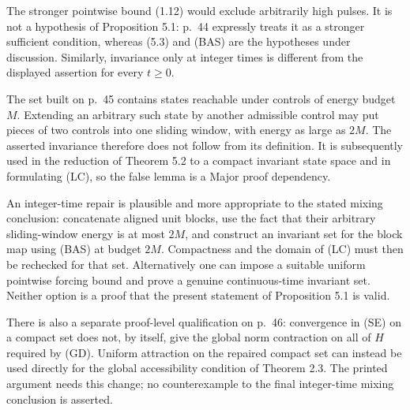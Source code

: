 \documentclass[10pt]{article}
\begin{document}
The stronger pointwise bound (1.12) would exclude arbitrarily high pulses. It is not a hypothesis of Proposition 5.1: p. 44 expressly treats it as a stronger sufficient condition, whereas (5.3) and (BAS) are the hypotheses under discussion. Similarly, invariance only at integer times is different from the displayed assertion for every \(t\geq0\).\par
The set built on p. 45 contains states reachable under controls of energy budget \(M\). Extending an arbitrary such state by another admissible control may put pieces of two controls into one sliding window, with energy as large as \(2M\). The asserted invariance therefore does not follow from its definition. It is subsequently used in the reduction of Theorem 5.2 to a compact invariant state space and in formulating (LC), so the false lemma is a Major proof dependency.\par
An integer-time repair is plausible and more appropriate to the stated mixing conclusion: concatenate aligned unit blocks, use the fact that their arbitrary sliding-window energy is at most \(2M\), and construct an invariant set for the block map using (BAS) at budget \(2M\). Compactness and the domain of (LC) must then be rechecked for that set. Alternatively one can impose a suitable uniform pointwise forcing bound and prove a genuine continuous-time invariant set. Neither option is a proof that the present statement of Proposition 5.1 is valid.\par
There is also a separate proof-level qualification on p. 46: convergence in (SE) on a compact set does not, by itself, give the global norm contraction on all of \(H\) required by (GD). Uniform attraction on the repaired compact set can instead be used directly for the global accessibility condition of Theorem 2.3. The printed argument needs this change; no counterexample to the final integer-time mixing conclusion is asserted.\par
\end{document}
